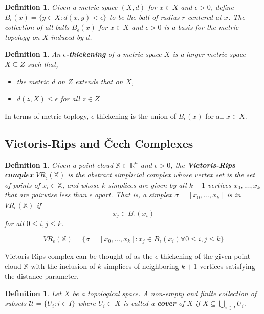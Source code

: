 \documentclass{article}
\newcommand{\be}{\begin{equation}}
\newcommand{\ee}{\end{equation}}
\newtheorem{definition}[theorem]{Definition}
\begin{document}
\begin{definition} Given a metric space $(X,d)$ for $x \in X$ and $\epsilon>0$, define $B_{\epsilon}(x) = \{y \in X : d(x,y) < \epsilon\}$ to be the ball of radius $r$ centered at $x$. The collection of all balls $B_{\epsilon}(x)$ for $x \in X$ and $\epsilon>0$ is a basis for the metric topology on $X$ induced by $d$.
\end{definition}

\begin{definition} An \textbf{$\epsilon$-thickening} of a metric space $X$ is a larger metric space $X \subseteq Z$ such that,
\begin{itemize}
    \item the metric d on $Z$ extends that on $X$,
    \item $d(z,X) \leq \epsilon$ for all $z \in Z$
\end{itemize}
\end{definition}
In terms of metric toplogy, $\epsilon$-thickening is the union of $B_{\epsilon}(x)$ for all $x \in X$. 

\subsection{Vietoris-Rips and \v{C}ech Complexes}

\begin{definition} Given a point cloud $\mathbb{X} \subset \mathbb{R}^n$ and $\epsilon > 0$, the \textbf{Vietoris-Rips complex} $VR_{\epsilon}(\mathbb{X})$ is the abstract simplicial complex whose vertex set is the set of points of $x_i \in \mathbb{X}$, and whose $k$-simplices are given by all $k+1$ vertices ${x_0, ..., x_k}$ that are pairwise less than $\epsilon$ apart. That is, a simplex  $\sigma = [x_0, ..., x_k]$ is in $VR_{\epsilon}(\mathbb{X})$ if
\be
x_j \in B_{\epsilon}(x_i) 
\ee
for all $0 \leq i,j \leq k$. 

\be
VR_{\epsilon}(\mathbb{X}) = \{\sigma = [x_0,...,x_k] : x_j \in B_{\epsilon}(x_i)  \forall  0 \leq i,j \leq k \}
\ee
\end{definition}
Vietoris-Rips complex can be thought of as the $\epsilon$-thickening of the given point cloud $\mathbb{X}$ with the inclusion of $k$-simplices of neighboring $k+1$ vertices satisfying the distance parameter. 

\begin{definition}Let $X$ be a topological space. A non-empty and finite collection of subsets $\mathcal{U} = \{U_i : i \in I\}$ where $U_i \subset X$ is called a \textbf{cover} of $X$ if $X \subseteq \bigcup_{i\in I} U_{i}$.
\end{definition}
\end{document}
